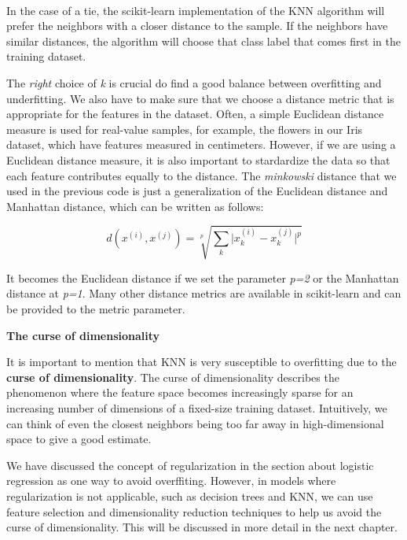 \documentclass[11pt]{article}
\begin{document}
    \begin{center}
    \end{center}
    { \hspace*{\fill} \\}
    
    In the case of a tie, the scikit-learn implementation of the KNN
algorithm will prefer the neighbors with a closer distance to the
sample. If the neighbors have similar distances, the algorithm will
choose that class label that comes first in the training dataset.

The \emph{right} choice of \emph{k} is crucial do find a good balance
between overfitting and underfitting. We also have to make sure that we
choose a distance metric that is appropriate for the features in the
dataset. Often, a simple Euclidean distance measure is used for
real-value samples, for example, the flowers in our Iris dataset, which
have features measured in centimeters. However, if we are using a
Euclidean distance measure, it is also important to stardardize the data
so that each feature contributes equally to the distance. The
\emph{minkowski} distance that we used in the previous code is just a
generalization of the Euclidean distance and Manhattan distance, which
can be written as follows:

\[d(x^{(i)}, x^{(j)}) = \sqrt[p]{\sum_k \vert x_k^{(i)} - x_k^{(j)} \vert^p}\]

It becomes the Euclidean distance if we set the parameter \emph{p=2} or
the Manhattan distance at \emph{p=1}. Many other distance metrics are
available in scikit-learn and can be provided to the metric parameter.

    \textbf{The curse of dimensionality}

It is important to mention that KNN is very susceptible to overfitting
due to the \textbf{curse of dimensionality}. The curse of dimensionality
describes the phenomenon where the feature space becomes increasingly
sparse for an increasing number of dimensions of a fixed-size training
dataset. Intuitively, we can think of even the closest neighbors being
too far away in high-dimensional space to give a good estimate.

We have discussed the concept of regularization in the section about
logistic regression as one way to avoid overffiting. However, in models
where regularization is not applicable, such as decision trees and KNN,
we can use feature selection and dimensionality reduction techniques to
help us avoid the curse of dimensionality. This will be discussed in
more detail in the next chapter.
\end{document}
